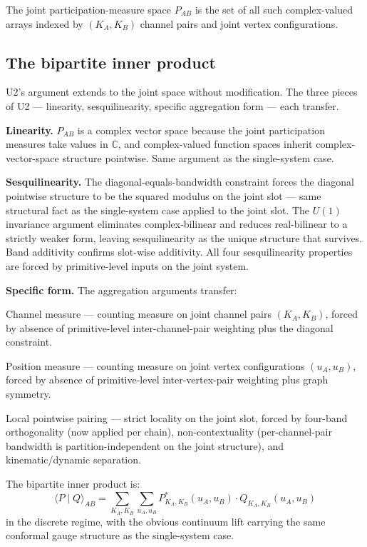 \documentclass[11pt,a4paper]{article}
\begin{document}
The joint participation-measure space $P_{AB}$ is the set of all such complex-valued arrays indexed by $(K_A, K_B)$ channel pairs and joint vertex configurations.

\subsection{The bipartite inner product}

U2's argument extends to the joint space without modification. The three pieces of U2 --- linearity, sesquilinearity, specific aggregation form --- each transfer.

\textbf{Linearity.} $P_{AB}$ is a complex vector space because the joint participation measures take values in $\mathbb{C}$, and complex-valued function spaces inherit complex-vector-space structure pointwise. Same argument as the single-system case.

\textbf{Sesquilinearity.} The diagonal-equals-bandwidth constraint forces the diagonal pointwise structure to be the squared modulus on the joint slot --- same structural fact as the single-system case applied to the joint slot. The $U(1)$ invariance argument eliminates complex-bilinear and reduces real-bilinear to a strictly weaker form, leaving sesquilinearity as the unique structure that survives. Band additivity confirms slot-wise additivity. All four sesquilinearity properties are forced by primitive-level inputs on the joint system.

\textbf{Specific form.} The aggregation arguments transfer:

Channel measure --- counting measure on joint channel pairs $(K_A, K_B)$, forced by absence of primitive-level inter-channel-pair weighting plus the diagonal constraint.

Position measure --- counting measure on joint vertex configurations $(u_A, u_B)$, forced by absence of primitive-level inter-vertex-pair weighting plus graph symmetry.

Local pointwise pairing --- strict locality on the joint slot, forced by four-band orthogonality (now applied per chain), non-contextuality (per-channel-pair bandwidth is partition-independent on the joint structure), and kinematic/dynamic separation.

The bipartite inner product is:
\[
\langle P \mid Q \rangle_{AB} = \sum_{K_A, K_B} \sum_{u_A, u_B} P^{*}_{K_A, K_B}(u_A, u_B) \cdot Q_{K_A, K_B}(u_A, u_B)
\]
in the discrete regime, with the obvious continuum lift carrying the same conformal gauge structure as the single-system case.
\end{document}
